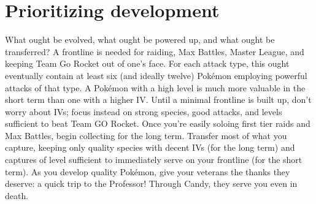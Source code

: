 \section{Prioritizing development}
\label{sec:developmentpriority}
What ought be evolved, what ought be powered up, and what ought be transferred?
A frontline is needed for raiding, Max Battles, Master League, and keeping Team Go Rocket out of one's face.
For each attack type, this ought eventually contain at least six (and ideally twelve) Pokémon
  employing powerful attacks of that type.
A Pokémon with a high level is much more valuable in the short term than one with a higher IV.
Until a minimal frontline is built up, don't worry about IVs; focus instead on strong species,
  good attacks, and levels sufficient to beat Team GO Rocket.
Once you're easily soloing first tier raids and Max Battles, begin collecting for the long term.
Transfer most of what you capture, keeping only quality species with decent IVs (for the long term)
  and captures of level sufficient to immediately serve on your frontline (for the short term).
As you develop quality Pokémon, give your veterans the thanks they deserve: a quick trip to the Professor!
Through Candy, they serve you even in death.
